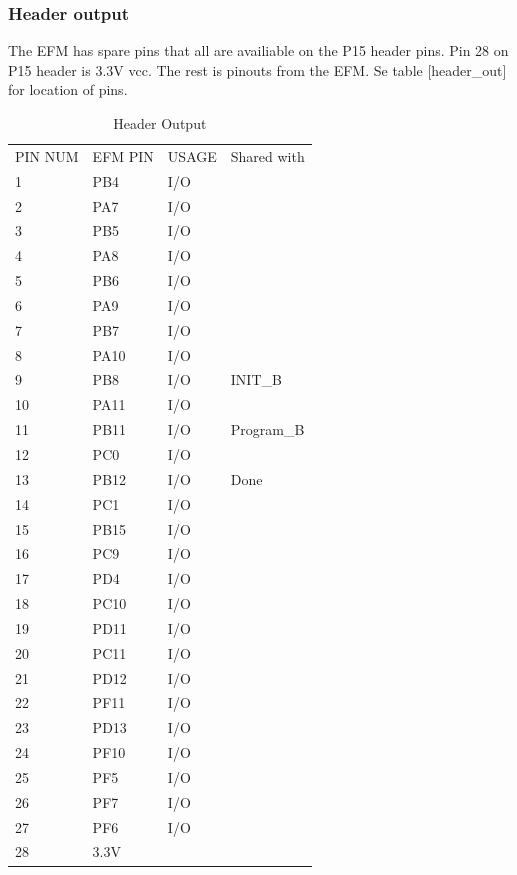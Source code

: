 \subsubsection{Header output}
The EFM has spare pins that all are availiable on the P15 header pins. Pin 28 on P15 header is 3.3V vcc. The rest is pinouts from the EFM. Se table [header\_out] for location of pins.
\begin{table}[]
\centering
\caption{Header Output}
\label{header_out}
\begin{tabular}{llll}
PIN NUM & EFM PIN & USAGE & Shared with \\
1       & PB4     & I/O   &             \\
2       & PA7     & I/O   &             \\
3       & PB5     & I/O   &             \\
4       & PA8     & I/O   &             \\
5       & PB6     & I/O   &             \\
6       & PA9     & I/O   &             \\
7       & PB7     & I/O   &             \\
8       & PA10    & I/O   &             \\
9       & PB8     & I/O   & INIT\_B     \\
10      & PA11    & I/O   &             \\
11      & PB11    & I/O   & Program\_B  \\
12      & PC0     & I/O   &             \\
13      & PB12    & I/O   & Done        \\
14      & PC1     & I/O   &             \\
15      & PB15    & I/O   &             \\
16      & PC9     & I/O   &             \\
17      & PD4     & I/O   &             \\
18      & PC10    & I/O   &             \\
19      & PD11    & I/O   &             \\
20      & PC11    & I/O   &             \\
21      & PD12    & I/O   &             \\
22      & PF11    & I/O   &             \\
23      & PD13    & I/O   &             \\
24      & PF10    & I/O   &             \\
25      & PF5     & I/O   &             \\
26      & PF7     & I/O   &             \\
27      & PF6     & I/O   &             \\
28      & 3.3V    &       &            
\end{tabular}
\end{table}


